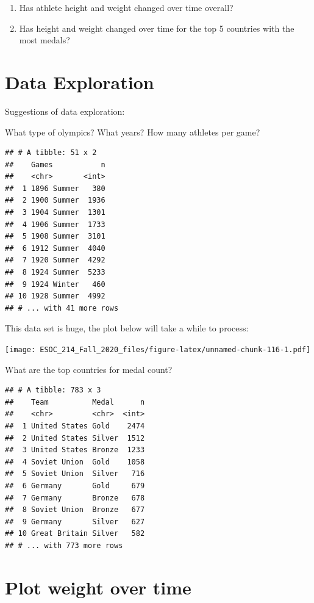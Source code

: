 \documentclass[
]{book}
\begin{document}
\begin{enumerate}
\def\labelenumi{\arabic{enumi})}
\item
  Has athlete height and weight changed over time overall?
\item
  Has height and weight changed over time for the top 5 countries with the most medals?
\end{enumerate}

\hypertarget{data-exploration}{%
\section{Data Exploration}\label{data-exploration}}

Suggestions of data exploration:

What type of olympics? What years? How many athletes per game?

\begin{verbatim}
## # A tibble: 51 x 2
##    Games           n
##    <chr>       <int>
##  1 1896 Summer   380
##  2 1900 Summer  1936
##  3 1904 Summer  1301
##  4 1906 Summer  1733
##  5 1908 Summer  3101
##  6 1912 Summer  4040
##  7 1920 Summer  4292
##  8 1924 Summer  5233
##  9 1924 Winter   460
## 10 1928 Summer  4992
## # ... with 41 more rows
\end{verbatim}

This data set is huge, the plot below will take a while to process:

\texttt{[image: ESOC\_214\_Fall\_2020\_files/figure-latex/unnamed-chunk-116-1.pdf]}

What are the top countries for medal count?

\begin{verbatim}
## # A tibble: 783 x 3
##    Team          Medal      n
##    <chr>         <chr>  <int>
##  1 United States Gold    2474
##  2 United States Silver  1512
##  3 United States Bronze  1233
##  4 Soviet Union  Gold    1058
##  5 Soviet Union  Silver   716
##  6 Germany       Gold     679
##  7 Germany       Bronze   678
##  8 Soviet Union  Bronze   677
##  9 Germany       Silver   627
## 10 Great Britain Silver   582
## # ... with 773 more rows
\end{verbatim}

\hypertarget{plot-weight-over-time}{%
\section{Plot weight over time}\label{plot-weight-over-time}}
\end{document}
